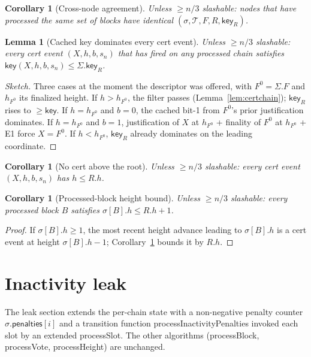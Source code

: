 \documentclass{article}
\newcommand{\T}{\ensuremath{\mathcal{T}}}
\newcommand{\penalties}{\mathsf{penalties}}
\newcommand{\key}{\mathsf{key}}
\newcommand{\processSlot}{\textsf{processSlot}\xspace}
\newcommand{\processBlock}{\textsf{processBlock}\xspace}
\newcommand{\processHeight}{\textsf{processHeight}\xspace}
\newcommand{\processVote}{\textsf{processVote}\xspace}
\newcommand{\processInactivityPenalties}{\textsf{processInactivityPenalties}\xspace}
\theoremstyle{plain}
\newtheorem{corollary}[theorem]{Corollary}
\newtheorem{lemma}[theorem]{Lemma}
\theoremstyle{definition}
\theoremstyle{remark}
\begin{document}
\begin{corollary}[Cross-node agreement]\label{cor:agreement}
Unless $\geq n/3$ slashable: nodes that have processed the same set of blocks have identical $(\sigma, \T, F, R, \key_R)$.
\end{corollary}

\begin{lemma}[Cached key dominates every cert event]\label{lem:Rs-key-dominates}
Unless $\geq n/3$ slashable: every cert event $(X, h, b, s_n)$ that has fired on any processed chain satisfies $\key(X, h, b, s_n) \leq \Sigma.\key_R$.
\end{lemma}

\begin{proof}[Sketch]
Three cases at the moment the descriptor was offered, with $F^0 = \Sigma.F$ and $h_{F^0}$ its finalized height. If $h > h_{F^0}$, the filter passes (Lemma~\ref{lem:certchain}); $\key_R$ rises to $\geq \key$. If $h = h_{F^0}$ and $b = 0$, the cached bit-1 from $F^0$'s prior justification dominates. If $h = h_{F^0}$ and $b = 1$, justification of $X$ at $h_{F^0}$ + finality of $F^0$ at $h_{F^0}$ + E1 force $X = F^0$. If $h < h_{F^0}$, $\key_R$ already dominates on the leading coordinate.
\end{proof}

\begin{corollary}[No cert above the root]\label{cor:no-high-cert}
Unless $\geq n/3$ slashable: every cert event $(X, h, b, s_n)$ has $h \leq R.h$.
\end{corollary}

\begin{corollary}[Processed-block height bound]\label{cor:processed-height-bound}
Unless $\geq n/3$ slashable: every processed block $B$ satisfies $\sigma[B].h \leq R.h + 1$.
\end{corollary}

\begin{proof}[Proof] If $\sigma[B].h \geq 1$, the most recent height advance leading to $\sigma[B].h$ is a cert event at height $\sigma[B].h - 1$; Corollary~\ref{cor:no-high-cert} bounds it by $R.h$. \end{proof}

\section{Inactivity leak}\label{sec:leak}

The leak section extends the per-chain state with a non-negative penalty counter $\sigma.\penalties[i]$ and a transition function \processInactivityPenalties invoked each slot by an extended \processSlot. The other algorithms (\processBlock, \processVote, \processHeight) are unchanged.
\end{document}
